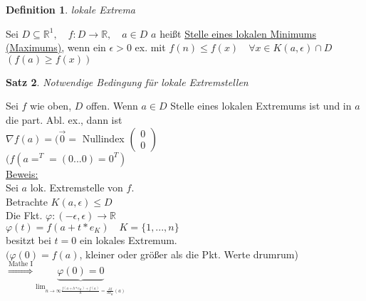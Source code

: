 \documentclass[a4paper,11pt]{article}
\newtheorem{definition}{Definition}[section]
\newtheorem{satz}[definition]{Satz}
\begin{document}
\begin{definition}
	lokale Extrema
\end{definition}
Sei $D\subseteq\mathbb{R}^1,\quad f\colon D\to\mathbb{R},\quad a\in D$ $a$ heißt \underline{Stelle eines lokalen Minimums (Maximums)}, wenn ein $\epsilon>0$ ex. mit $f(n)\leq f(x)\quad\forall x\in K(a,\epsilon)\cap D$ \\
$(f(a)\geq f(x))$

\begin{satz}
	Notwendige Bedingung für lokale Extremstellen
\end{satz}
Sei $f$ wie oben, $D$ offen. Wenn $a\in D$ Stelle eines lokalen Extremums ist und in $a$ die part. Abl. ex., dann ist \\
$\nabla f(a)=(\overset{\rightarrow}{0}=$ Nullindex $\begin{pmatrix}0\\0\end{pmatrix}$ \\
$(f(a=^T=(0...0)=0^T)$ \\
\underline{Beweis:} \\
Sei $a$ lok. Extremstelle von $f$. \\
Betrachte $K(a,\epsilon)\leq D$ \\
Die Fkt. $\varphi\colon(-\epsilon,\epsilon)\to\mathbb{R}$ \\
$\varphi(t)=f(a+t*e_K)\quad K=\{1,...,n\}$ \\
besitzt bei $t=0$ ein lokales Extremum. \\
$(\varphi(0)=f(a)$, kleiner oder größer als die Pkt. Werte drumrum) \\
$\overset{\text{Mathe I}}{\Rightarrow}\underbrace{\varphi(0)=0}_{\lim_{n\to\infty\frac{f(a+h*e_K)+f(a)}{h}=\frac{\partial f}{\partial x_K}(a)}}$ 
\end{document}
